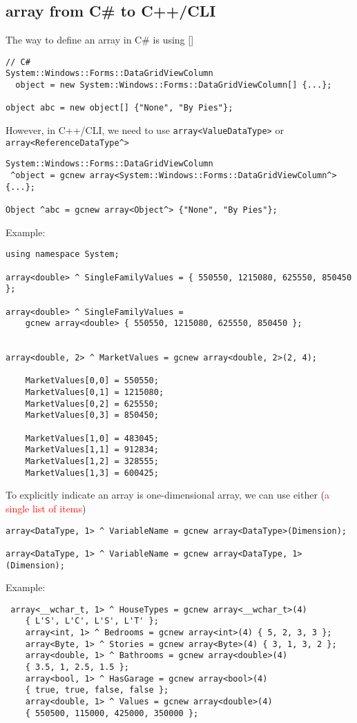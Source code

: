 \subsection{array from C\# to C++/CLI}

The way to define an array in C\# is using []
\begin{verbatim}
// C#
System::Windows::Forms::DataGridViewColumn 
  object = new System::Windows::Forms::DataGridViewColumn[] {...};

object abc = new object[] {"None", "By Pies"};   
\end{verbatim}

However, in C++/CLI, we need to use \verb!array<ValueDataType>! or
\verb!array<ReferenceDataType^>!

\begin{verbatim}
System::Windows::Forms::DataGridViewColumn 
 ^object = gcnew array<System::Windows::Forms::DataGridViewColumn^> {...};
 
Object ^abc = gcnew array<Object^> {"None", "By Pies"}; 
\end{verbatim}


Example:
\begin{verbatim}
using namespace System;

array<double> ^ SingleFamilyValues = { 550550, 1215080, 625550, 850450 };

array<double> ^ SingleFamilyValues =
	gcnew array<double> { 550550, 1215080, 625550, 850450 };
	
	
array<double, 2> ^ MarketValues = gcnew array<double, 2>(2, 4);
	
    MarketValues[0,0] = 550550;
    MarketValues[0,1] = 1215080;
    MarketValues[0,2] = 625550;
    MarketValues[0,3] = 850450;

    MarketValues[1,0] = 483045;
    MarketValues[1,1] = 912834;
    MarketValues[1,2] = 328555;
    MarketValues[1,3] = 600425;	
\end{verbatim}

To explicitly indicate an array is one-dimensional array, we can use either (\textcolor{red}{a single list of items})
\begin{verbatim}
array<DataType, 1> ^ VariableName = gcnew array<DataType>(Dimension);

array<DataType, 1> ^ VariableName = gcnew array<DataType, 1>(Dimension);
\end{verbatim}
Example:
\begin{verbatim}
 array<__wchar_t, 1> ^ HouseTypes = gcnew array<__wchar_t>(4)
	{ L'S', L'C', L'S', L'T' };
    array<int, 1> ^ Bedrooms = gcnew array<int>(4) { 5, 2, 3, 3 };
    array<Byte, 1> ^ Stories = gcnew array<Byte>(4) { 3, 1, 3, 2 };
    array<double, 1> ^ Bathrooms = gcnew array<double>(4)
	{ 3.5, 1, 2.5, 1.5 };
    array<bool, 1> ^ HasGarage = gcnew array<bool>(4)
	{ true, true, false, false };
    array<double, 1> ^ Values = gcnew array<double>(4)
	{ 550500, 115000, 425000, 350000 };
\end{verbatim}



